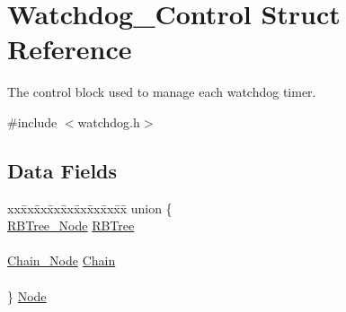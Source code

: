 \hypertarget{structWatchdog__Control}{}\section{Watchdog\+\_\+\+Control Struct Reference}
\label{structWatchdog__Control}


The control block used to manage each watchdog timer.  




{\ttfamily \#include $<$watchdog.\+h$>$}

\subsection*{Data Fields}
\begin{DoxyCompactItemize}
\item 
\mbox{\label{structWatchdog__Control_a810f49839114f6049cf2129eee416cc2}} 
\begin{tabbing}
xx\=xx\=xx\=xx\=xx\=xx\=xx\=xx\=xx\=\kill
union \{\\
\>\mbox{\hyperlink{structRBTree__Node}{RBTree\_Node}} \mbox{\hyperlink{structWatchdog__Control_a240fc1c5df34627a5d15125affcb3958}{RBTree}}\\
\>\\
\>\mbox{\hyperlink{group__RTEMSScoreChain_ga0dd4bfcca1ac7f90de2842e447846d3d}{Chain\_Node}} \mbox{\hyperlink{structWatchdog__Control_abd84bd662b7236d0757a499f1ce090db}{Chain}}\\
\>\\
\} \mbox{\hyperlink{structWatchdog__Control_a810f49839114f6049cf2129eee416cc2}{Node}}\\


\end{tabbing}
\end{DoxyCompactItemize}
